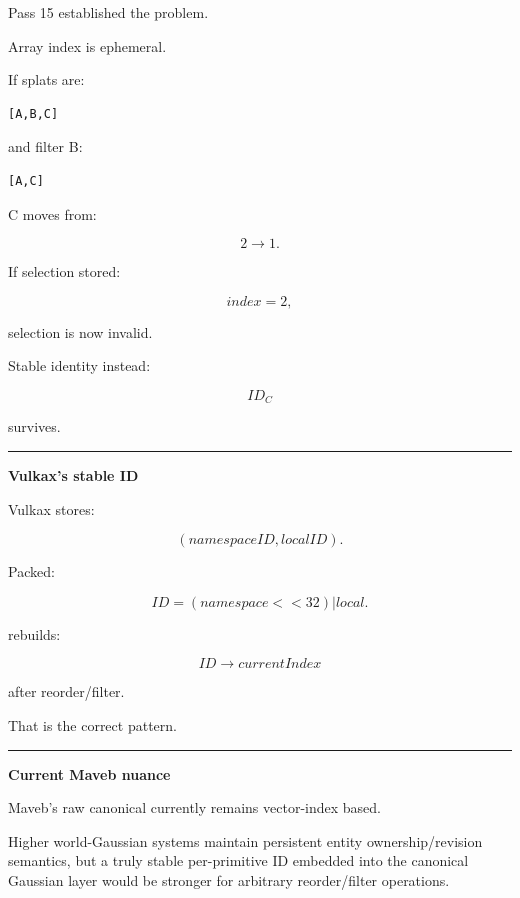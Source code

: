 Pass 15 established the problem.

Array index is ephemeral.

If splats are:

\protect{}\label{f90y7n}%
\begin{verbatim}
[A,B,C]
\end{verbatim}

and filter B:

\protect{}\label{f1gg6w}%
\begin{verbatim}
[A,C]
\end{verbatim}

C moves from:

\[
2\rightarrow1.
\]

If selection stored:

\[
index=2,
\]

selection is now invalid.

Stable identity instead:

\[
ID_C
\]

survives.

\begin{center}\rule{0.5\linewidth}{0.5pt}\end{center}

\textbf{Vulkax's stable ID}

Vulkax stores:

\[
(namespaceID,localID).
\]

Packed:

\[
\boxed{
ID=
(namespace<<32)
|
local.
}
\]

 rebuilds:

\[
ID\rightarrow currentIndex
\]

after reorder/filter.

That is the correct pattern.

\begin{center}\rule{0.5\linewidth}{0.5pt}\end{center}

\textbf{Current Maveb nuance}

Maveb's raw canonical  currently remains vector-index based.

Higher world-Gaussian systems maintain persistent entity ownership/revision semantics, but a truly stable per-primitive ID embedded into the canonical Gaussian layer would be stronger for arbitrary reorder/filter operations.

